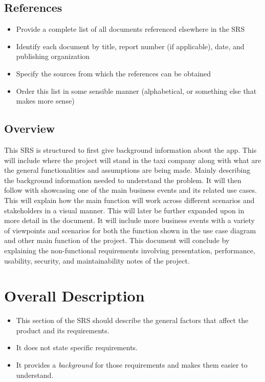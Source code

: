 \documentclass[]{article}
\begin{document}
\subsection{References}
\label{sub:references}
\begin{itemize}
	\item Provide a complete list of all documents referenced elsewhere in the SRS
	\item Identify each document by title, report number (if applicable), date, and publishing organization
	\item Specify the sources from which the references can be obtained
	\item Order this list in some sensible manner (alphabetical, or something else that makes more sense)
\end{itemize}

\subsection{Overview}
\label{sub:overview}
This SRS is structured to first give background information about the app. This will include where the project will stand in the taxi company along with what are the general functionalities and assumptions are being made. Mainly describing the background information needed to understand the problem. It will then follow with showcasing one of the main business events and its related use cases. This will explain how the main function will work across different scenarios and stakeholders in a visual manner. This will later be further expanded upon in more detail in the document. It will include more business events with a variety of viewpoints and scenarios for both the function shown in the use case diagram and other main function of the project. This document will conclude by explaining the non-functional requirements involving presentation, performance, usability, security, and maintainability notes of the project.


\section{Overall Description}
\label{sec:overall_description}

\begin{itemize}
	\item This section of the SRS should describe the general factors that affect the product and its requirements. 
	\item It does not state specific requirements.
	\item It provides a \emph{background} for those requirements and makes them easier to understand.
\end{itemize}
\end{document}
